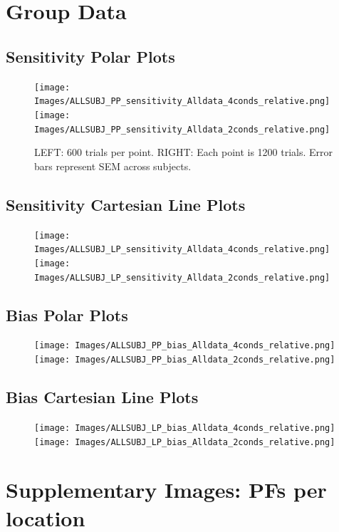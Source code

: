 \documentclass[11pt]{article} %
\begin{document}
\newpage
\section{Group Data}
\subsection{Sensitivity Polar Plots}
\begin{figure}[H]
\centering %
\texttt{[image: Images/ALLSUBJ\_PP\_sensitivity\_Alldata\_4conds\_relative.png]}
\texttt{[image: Images/ALLSUBJ\_PP\_sensitivity\_Alldata\_2conds\_relative.png]}
\caption{LEFT: 600 trials per point. RIGHT: Each point is 1200 trials. Error bars represent SEM across subjects.}
\end{figure}
\subsection{Sensitivity Cartesian Line Plots}
\begin{figure}[H]
\centering %
\texttt{[image: Images/ALLSUBJ\_LP\_sensitivity\_Alldata\_4conds\_relative.png]}
\texttt{[image: Images/ALLSUBJ\_LP\_sensitivity\_Alldata\_2conds\_relative.png]}
\end{figure}
\newpage
\subsection{Bias Polar Plots}
\begin{figure}[H]
\centering %
\texttt{[image: Images/ALLSUBJ\_PP\_bias\_Alldata\_4conds\_relative.png]}
\texttt{[image: Images/ALLSUBJ\_PP\_bias\_Alldata\_2conds\_relative.png]}
\end{figure}
\subsection{Bias Cartesian Line Plots}
\begin{figure}[H]
\centering %
\texttt{[image: Images/ALLSUBJ\_LP\_bias\_Alldata\_4conds\_relative.png]}
\texttt{[image: Images/ALLSUBJ\_LP\_bias\_Alldata\_2conds\_relative.png]}
\end{figure}

\newpage
\section{Supplementary Images: PFs per location}
\end{document}
